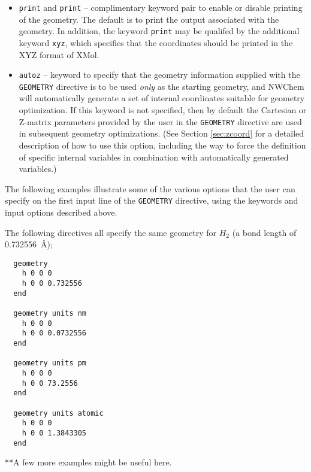 \begin{itemize}
\item \verb+print+ and \verb+print+ -- complimentary keyword pair to
enable or disable printing of the geometry.  The default is to print   
the output associated with the geometry.  In addition, the keyword 
\verb+print+ may
be qualifed by the additional keyword \verb+xyz+, which specifies
that the coordinates should be printed in the XYZ format of XMol.

\item \verb+autoz+ -- keyword to specify that the geometry 
information supplied
with the \verb+GEOMETRY+ directive is to be used {\em only} as the starting
geometry, and NWChem will automatically generate a set of internal coordinates
suitable for geometry optimization.  If this keyword is not specified, then
by default the Cartesian or Z-matrix parameters provided by the user
in the \verb+GEOMETRY+ directive are used in subsequent geometry
optimizations. 
(See Section \ref{sec:zcoord} for a detailed description of how to
use this option, including the way to
force the definition of specific internal variables in combination
with automatically generated variables.)
\end{itemize}

The following examples illustrate some of the various options that the user
can specify on the first input line of the \verb+GEOMETRY+ directive, using
the keywords and input options described above.


The following directives all specify the same geometry for $H_2$
(a bond length of 0.732556\ \AA);
\begin{verbatim}
  geometry
    h 0 0 0
    h 0 0 0.732556
  end

  geometry units nm
    h 0 0 0
    h 0 0 0.0732556
  end

  geometry units pm
    h 0 0 0
    h 0 0 73.2556
  end

  geometry units atomic
    h 0 0 0
    h 0 0 1.3843305
  end
\end{verbatim}
      
\Large
**A few more examples might be useful here.
\normalsize

